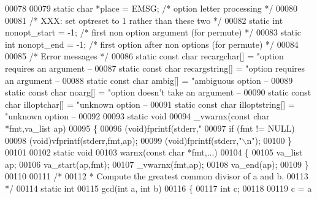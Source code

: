 \begin{DoxyCode}
00078 
00079 \textcolor{keyword}{static} \textcolor{keywordtype}{char} *place = EMSG; \textcolor{comment}{/* option letter processing */}
00080 
00081 \textcolor{comment}{/* XXX: set optreset to 1 rather than these two */}
00082 \textcolor{keyword}{static} \textcolor{keywordtype}{int} nonopt_start = -1; \textcolor{comment}{/* first non option argument (for permute) */}
00083 \textcolor{keyword}{static} \textcolor{keywordtype}{int} nonopt_end = -1;   \textcolor{comment}{/* first option after non options (for permute) */}
00084 
00085 \textcolor{comment}{/* Error messages */}
00086 \textcolor{keyword}{static} \textcolor{keyword}{const} \textcolor{keywordtype}{char} recargchar[] = \textcolor{stringliteral}{"option requires an argument -- %
00087 \textcolor{keyword}{static} \textcolor{keyword}{const} \textcolor{keywordtype}{char} recargstring[] = \textcolor{stringliteral}{"option requires an argument -- %
00088 \textcolor{keyword}{static} \textcolor{keyword}{const} \textcolor{keywordtype}{char} ambig[] = \textcolor{stringliteral}{"ambiguous option -- %
00089 \textcolor{keyword}{static} \textcolor{keyword}{const} \textcolor{keywordtype}{char} noarg[] = \textcolor{stringliteral}{"option doesn't take an argument -- %
00090 \textcolor{keyword}{static} \textcolor{keyword}{const} \textcolor{keywordtype}{char} illoptchar[] = \textcolor{stringliteral}{"unknown option -- %
00091 \textcolor{keyword}{static} \textcolor{keyword}{const} \textcolor{keywordtype}{char} illoptstring[] = \textcolor{stringliteral}{"unknown option -- %
00092 
00093 \textcolor{keyword}{static} \textcolor{keywordtype}{void}
00094 _vwarnx(\textcolor{keyword}{const} \textcolor{keywordtype}{char} *fmt,va\_list ap)
00095 \{
00096   (void)fprintf(stderr,\textcolor{stringliteral}{"%
00097   \textcolor{keywordflow}{if} (fmt != NULL)
00098     (void)vfprintf(stderr,fmt,ap);
00099   (void)fprintf(stderr,\textcolor{stringliteral}{"\(\backslash\)n"});
00100 \}
00101 
00102 \textcolor{keyword}{static} \textcolor{keywordtype}{void}
00103 warnx(\textcolor{keyword}{const} \textcolor{keywordtype}{char} *fmt,...)
00104 \{
00105   va\_list ap;
00106   va\_start(ap,fmt);
00107   _vwarnx(fmt,ap);
00108   va\_end(ap);
00109 \}
00110 
00111 \textcolor{comment}{/*}
00112 \textcolor{comment}{ * Compute the greatest common divisor of a and b.}
00113 \textcolor{comment}{ */}
00114 \textcolor{keyword}{static} \textcolor{keywordtype}{int}
00115 gcd(\textcolor{keywordtype}{int} a, \textcolor{keywordtype}{int} b)
00116 \{
00117     \textcolor{keywordtype}{int} c;
00118 
00119     c = a %
}}}}}}}
\end{DoxyCode}
